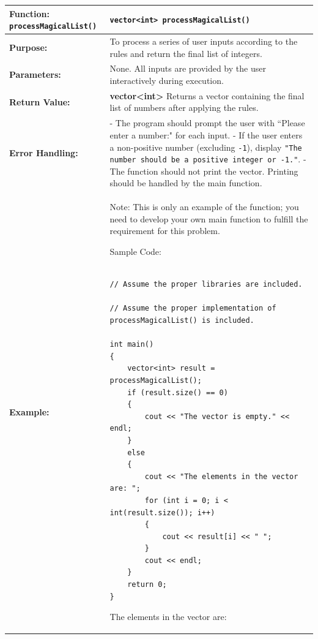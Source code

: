 \renewcommand{\arraystretch}{1.5} 
\begin{longtable}{|p{1.7in}|p{4.3in}|}
\hline
\textbf{Function:}  \texttt{processMagicalList()}& \texttt{vector<int> processMagicalList()}\\ \hline

\textbf{Purpose:} & To process a series of user inputs according to the rules and return the final list of integers. \\ \hline

\textbf{Parameters:} & 
None. All inputs are provided by the user interactively during execution. \\ \hline

\textbf{Return Value:} & 
\textbf{vector<int>} Returns a vector containing the final list of numbers after applying the rules.\\ \hline

\textbf{Error Handling:} & 
- The program should prompt the user with ``Please enter a number:" for each input. \newline
- If the user enters a non-positive number (excluding \verb|-1|), display \texttt{"The number should be a positive integer or -1."}. \newline
- The function should not print the vector. Printing should be handled by the main function. \\ \hline

\textbf{Example:}& 

Note: This is only an example of the function; you need to develop your own main function to fulfill the requirement for this problem.

Sample Code:

\begin{example}
        \begin{verbatim}

// Assume the proper libraries are included.

// Assume the proper implementation of processMagicalList() is included.

int main()
{
    vector<int> result = processMagicalList();
    if (result.size() == 0)
    {
        cout << "The vector is empty." << endl;
    }
    else
    {
        cout << "The elements in the vector are: ";
        for (int i = 0; i < int(result.size()); i++)
        {
            cout << result[i] << " ";
        }
        cout << endl;
    }
    return 0;
}
        \end{verbatim}
        \end{example}

        \begin{sample}
The elements in the vector are: \newline
8
        \end{sample}\\ \hline
\end{longtable}
 
